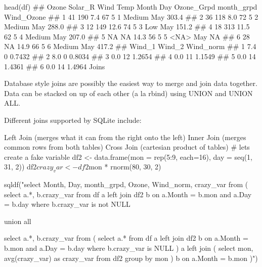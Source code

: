 head(df)
##   Ozone Solar_R Wind Temp Month Day Ozone_Grpd month_grpd Wind_Ozone
## 1    41     190  7.4   67     5   1     Medium        May      303.4
## 2    36     118  8.0   72     5   2     Medium        May      288.0
## 3    12     149 12.6   74     5   3        Low        May      151.2
## 4    18     313 11.5   62     5   4     Medium        May      207.0
## 5    NA      NA 14.3   56     5   5       <NA>        May         NA
## 6    28      NA 14.9   66     5   6     Medium        May      417.2
##   Wind_1 Wind_2 Wind_norm
## 1    7.4      0    0.7432
## 2    8.0      0    0.8034
## 3    0.0     12    1.2654
## 4    0.0     11    1.1549
## 5    0.0     14    1.4361
## 6    0.0     14    1.4964
Joins

Database style joins are possibly the easiest way to merge and join data together. Data can be stacked on up of each other (a la rbind) using UNION and UNION ALL.

Different joins supported by SQLite include:

Left Join (merges what it can from the right onto the left)
Inner Join (merges common rows from both tables)
Cross Join (cartesian product of tables)
# lets create a fake variable
df2 <- data.frame(mon = rep(5:9, each=16), day = seq(1, 31, 2))
df2$crazy_var <- df2$mon * rnorm(80, 30, 2)

sqldf("select Month, Day, month_grpd, Ozone, Wind_norm, crazy_var 
      from
      (
        select a.*, b.crazy_var
        from
        df a
        left join
        df2 b
        on a.Month = b.mon and a.Day = b.day
        where b.crazy_var is not NULL

        union all

        select a.*, b.crazy_var
        from
        (
          select a.*
          from
          df a
          left join
          df2 b
          on a.Month = b.mon and a.Day = b.day
          where b.crazy_var is NULL
        ) a
        left join
        (
          select mon, avg(crazy_var) as crazy_var
          from
          df2
          group by mon
        ) b
        on a.Month = b.mon
      )")

